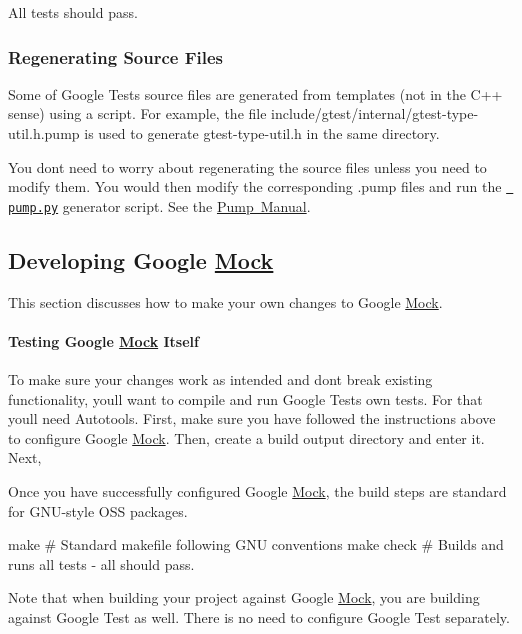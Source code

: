 All tests should pass.

\subsubsection*{Regenerating Source Files}

Some of Google Test\textquotesingle{}s source files are generated from templates (not in the C++ sense) using a script. For example, the file include/gtest/internal/gtest-\/type-\/util.\+h.\+pump is used to generate gtest-\/type-\/util.\+h in the same directory.

You don\textquotesingle{}t need to worry about regenerating the source files unless you need to modify them. You would then modify the corresponding {\ttfamily .pump} files and run the \textquotesingle{}\href{googletest/scripts/pump.py}{\texttt{ pump.\+py}}\textquotesingle{} generator script. See the \mbox{\hyperlink{_obj__test_2lib_2googletest-release-1_88_81_2googletest_2docs_2_pump_manual_8md}{Pump Manual}}.

\subsection*{Developing Google \mbox{\hyperlink{class_mock}{Mock}}}

This section discusses how to make your own changes to Google \mbox{\hyperlink{class_mock}{Mock}}.

\paragraph*{Testing Google \mbox{\hyperlink{class_mock}{Mock}} Itself}

To make sure your changes work as intended and don\textquotesingle{}t break existing functionality, you\textquotesingle{}ll want to compile and run Google Test\textquotesingle{}s own tests. For that you\textquotesingle{}ll need Autotools. First, make sure you have followed the instructions above to configure Google \mbox{\hyperlink{class_mock}{Mock}}. Then, create a build output directory and enter it. Next, 


Once you have successfully configured Google \mbox{\hyperlink{class_mock}{Mock}}, the build steps are standard for G\+N\+U-\/style O\+SS packages. \begin{DoxyVerb}make        # Standard makefile following GNU conventions
make check  # Builds and runs all tests - all should pass.
\end{DoxyVerb}


Note that when building your project against Google \mbox{\hyperlink{class_mock}{Mock}}, you are building against Google Test as well. There is no need to configure Google Test separately. 